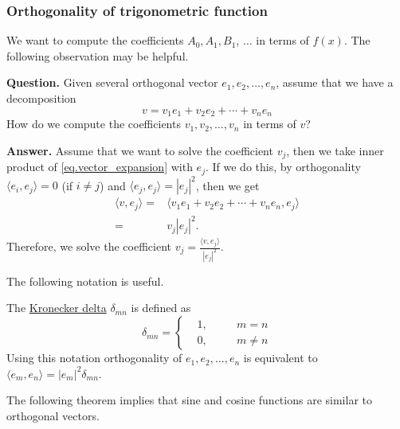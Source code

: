 \subsubsection{Orthogonality of trigonometric function}

We want to compute the coefficients $A_0, A_1, B_1$, $\dots$ in terms of $f(x)$. The following observation may be helpful.

\textbf{Question.} Given several orthogonal vector $e_1, e_2, \dots, e_n$, assume that we have a decomposition 
\begin{equation}\label{eq.vector_expansion}
    v = v_1e_1+v_2e_2+\cdots+v_ne_n
\end{equation}
How do we compute the coefficients $v_1, v_2, \dots, v_n$ in terms of $v$?

\textbf{Answer.} Assume that we want to solve the coefficient $v_j$, then we take inner product of \eqref{eq.vector_expansion} with $e_j$. If we do this, by orthogonality $\langle e_i, e_j\rangle = 0$ (if $i\ne j$) and $\langle e_j, e_j\rangle = |e_j|^2$, then we get
\begin{equation}\label{eq.vector_take_inner}
    \begin{split}
        \langle v, e_j\rangle =& \langle v_1e_1+v_2e_2+\cdots+v_ne_n, e_j\rangle 
        \\
        =& v_j  |e_j|^2.
    \end{split}
\end{equation}
Therefore, we solve the coefficient $v_j = \frac{\langle v, e_j\rangle}{|e_j|^2}$.

The following notation is useful.

\begin{definition}
The \underline{Kronecker delta} $\delta_{m n}$ is defined as
\begin{equation}\label{eq.Kronecker_delta}
    \delta_{m n}= 
    \left\{
    \begin{aligned}
        &1, \quad && m=n 
        \\ 
        &0, \quad && m \neq n 
    \end{aligned}
    \right.
\end{equation}
Using this notation orthogonality of $e_1, e_2, \dots, e_n$ is equivalent to $\langle e_m, e_n\rangle = |e_m|^2\delta_{m n}$.
\end{definition}

The following theorem implies that sine and cosine functions are similar to orthogonal vectors.

